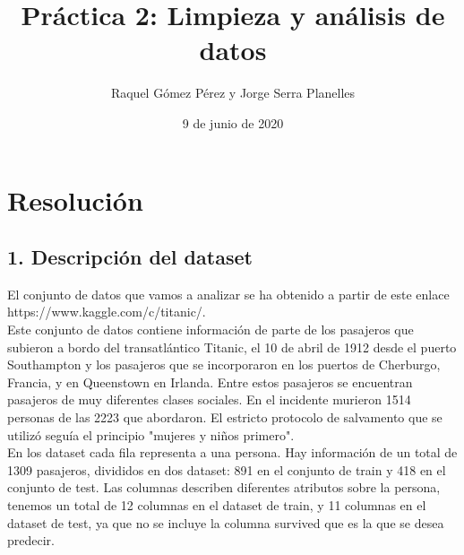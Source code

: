 \documentclass[12pt]{article}
\title{Práctica 2: Limpieza y análisis de datos}
\author{Raquel Gómez Pérez y Jorge Serra Planelles}
\date{9 de junio de 2020}
\begin{document}
\maketitle

\hypertarget{resolucion}{%
\section{Resolución}\label{resolucion}}

\hypertarget{descripcion}{%
\subsection{1. Descripción del dataset}\label{descripcion}}

El conjunto de datos que vamos a analizar se ha obtenido a partir de este enlace https://www.kaggle.com/c/titanic/.\\ Este conjunto de datos contiene información de parte de los pasajeros que subieron a bordo del transatlántico Titanic, el 10 de abril de 1912 desde el puerto Southampton y los pasajeros que se incorporaron en los puertos de Cherburgo, Francia, y en Queenstown en Irlanda. Entre estos pasajeros se encuentran pasajeros de muy diferentes clases sociales. En el incidente murieron 1514 personas de las 2223 que abordaron. El estricto protocolo de salvamento que se utilizó seguía el principio "mujeres y niños primero".\\
En los dataset cada fila representa a una persona. Hay información de un total de 1309 pasajeros, divididos en dos dataset: 891 en el conjunto de train y 418 en el conjunto de test. Las columnas describen diferentes atributos sobre la persona, tenemos un total de 12 columnas en el dataset de train, y 11 columnas en el dataset de test, ya que no se incluye la columna survived que es la que se desea predecir.
\end{document}
